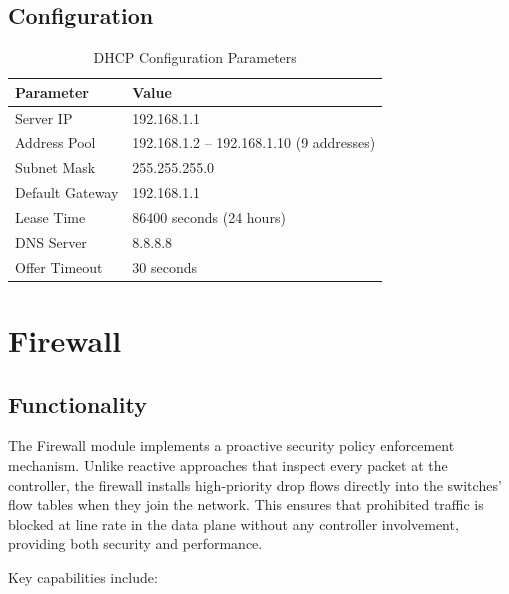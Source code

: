 \documentclass[12pt,a4paper]{article}
\begin{document}
\subsection{Configuration}

\begin{table}[H]
\centering
\begin{tabular}{@{}ll@{}}
\toprule
\textbf{Parameter} & \textbf{Value} \\
\midrule
Server IP & 192.168.1.1 \\
Address Pool & 192.168.1.2 -- 192.168.1.10 (9 addresses) \\
Subnet Mask & 255.255.255.0 \\
Default Gateway & 192.168.1.1 \\
Lease Time & 86400 seconds (24 hours) \\
DNS Server & 8.8.8.8 \\
Offer Timeout & 30 seconds \\
\bottomrule
\end{tabular}
\caption{DHCP Configuration Parameters}
\end{table}

\section{Firewall}

\subsection{Functionality}

The Firewall module implements a proactive security policy enforcement mechanism. Unlike reactive approaches that inspect every packet at the controller, the firewall installs high-priority drop flows directly into the switches' flow tables when they join the network. This ensures that prohibited traffic is blocked at line rate in the data plane without any controller involvement, providing both security and performance.

Key capabilities include:
\end{document}

